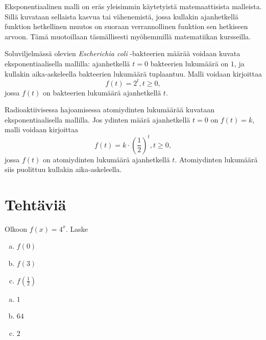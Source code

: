 Eksponentiaalinen malli on eräs yleisimmin käytetyistä matemaattisista
malleista. Sillä kuvataan sellaista kasvua tai vähenemistä, jossa
kullakin ajanhetkellä funktion hetkellinen muutos on suoraan
verrannollinen funktion sen hetkiseen arvoon. Tämä muotoillaan
täsmällisesti myöhemmillä matematiikan kursseilla.

\begin{esimerkki}
Soluviljelmässä olevien \emph{Escherichia coli} -bakteerien
määrää voidaan kuvata eksponentiaalisella mallilla: ajanhetkellä
$t = 0$ bakteerien lukumäärä on $1$, ja kullakin aika-askeleella
bakteerien lukumäärä tuplaantuu. Malli voidaan kirjoittaa
\[
f(t) = 2^t, t \ge 0,
\]
jossa $f(t)$ on bakteerien lukumäärä ajanhetkellä $t$.
\end{esimerkki}

\begin{esimerkki}
Radioaktiivisessa hajoamisessa atomiydinten lukumäärää kuvataan
eksponentiaalisella mallilla. Jos ydinten määrä ajanhetkellä
$t = 0$ on $f(t) = k$, malli voidaan kirjoittaa
\[
f(t) = k \cdot \left( \frac{1}{2} \right)^t, t \ge 0,
\]
jossa $f(t)$ on atomiydinten lukumäärä ajanhetkellä $t$. Atomiydinten
lukumäärä siis puolittuu kullakin aika-askeleella.
\end{esimerkki}

\section*{Tehtäviä}

\begin{tehtava}
Olkoon $f(x) = 4^x$. Laske
\begin{enumerate}[a)]
\item $f(0)$
\item $f(3)$
\item $f(\frac{1}{2})$
\end{enumerate}
\begin{vastaus}
\begin{enumerate}[a)]
\item $1$
\item $64$
\item $2$
\end{enumerate}
\end{vastaus}
\end{tehtava}

